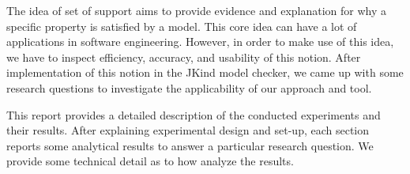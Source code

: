 ﻿The idea of set of support aims to provide evidence and explanation for why a specific property is satisfied by a model. 
This core idea can have a lot of applications in software engineering. However, in order to make use of this idea, we have to inspect efficiency, accuracy, and usability of this notion. After implementation of this notion in the JKind model checker, we came up with some research questions to investigate the applicability of our approach and tool. 

This report provides a detailed description of the conducted experiments and their results. After explaining experimental design and set-up, each section reports some analytical results to answer a particular research question. We provide some technical detail as to how analyze the results.

